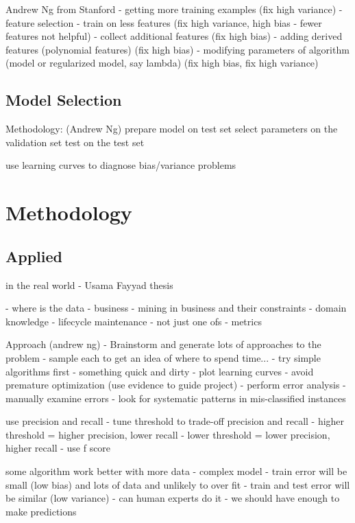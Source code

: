 \begin{bibunit}
Andrew Ng from Stanford
- getting more training examples (fix high variance)
- feature selection - train on less features (fix high variance, high bias - fewer features not helpful)
- collect additional features (fix high bias)
- adding derived features (polynomial features) (fix high bias)
- modifying parameters of algorithm (model or regularized model, say lambda) (fix high bias, fix high variance)


\subsection{Model Selection}

Methodology: (Andrew Ng)
prepare model on test set
select parameters on the validation set
test on the test set

use learning curves to diagnose bias/variance problems

\section{Methodology}

\subsection{Applied}
in the real world - Usama Fayyad thesis

- where is the data - business
- mining in business and their constraints
- domain knowledge
- lifecycle maintenance - not just one ofs
- metrics

Approach (andrew ng)
- Brainstorm and generate lots of approaches to the problem - sample each to get an idea of where to spend time...
- try simple algorithms first - something quick and dirty
- plot learning curves
	- avoid premature optimization (use evidence to guide project)
- perform error analysis
	- manually examine errors
	- look for systematic patterns in mis-classified instances

use precision and recall
- tune threshold to trade-off precision and recall
	- higher threshold = higher precision, lower recall
	- lower threshold = lower precision, higher recall
- use f score

some algorithm work better with more data
- complex model - train error will be small (low bias) and lots of data and unlikely to over fit - train and test error will be similar (low variance)
- can human experts do it - we should have enough to make predictions



\end{bibunit}
